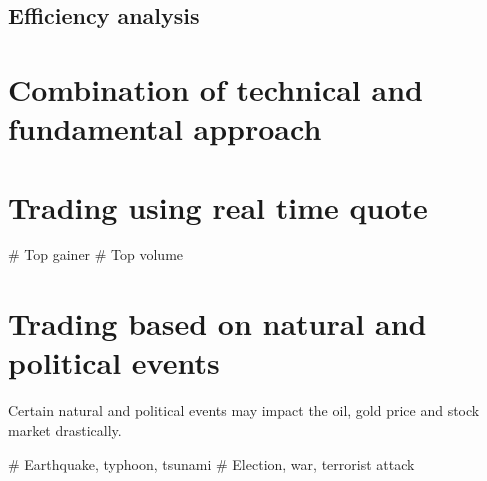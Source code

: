 \subsection{Efficiency analysis}

\section{Combination of technical and fundamental approach}

\section{Trading using real time quote}
\begin{listb}
# Top gainer
# Top volume
\end{listb}

\section{Trading based on natural and political events}
Certain natural and political events may impact the oil, gold price and stock market drastically.
\begin{listb}
# Earthquake, typhoon, tsunami
# Election, war, terrorist attack
\end{listb}

